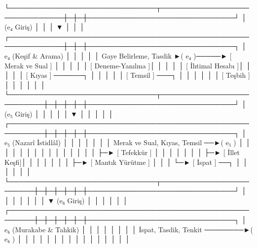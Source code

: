 \documentclass[11pt,a4paper]{article}
\begin{document}
└──────────────────────────────┬──────────────────────────────┼─┼─┼──────────────────────────────┘
                               │ (e₄ Giriş)                   │ │ │
                               ▼                              │ │ │
┌─────────────────────────────────────────────────────────────┼─┼─┼──────────────────────────────┐
│  e₄ (Keşif & Arama)                                         │ │ │                              │
│  { Gaye Belirleme, Tasdik }►( e₄ )─────► [ Merak ve Sual ]  │ │ │                              │
│                                           [ Deneme-Yanılma ]│ │ │                              │
│                                           [ İhtimal Hesabı ]│ │ │                              │
│                                           [ Kıyas ] ──────┐ │ │ │                              │
│                                           [ Temsil ] ───┐ │ │ │ │                              │
│                                           [ Teşbih ]    │ │ │ │ │                              │
└──────────────────────────────┬──────────────────────────┼─┼─┼─┼─┼──────────────────────────────┘
                               │ (e₅ Giriş)               │ │ │ │ │
                               ▼                          │ │ │ │ │
┌─────────────────────────────────────────────────────────┼─┼─┼─┼─┼──────────────────────────────┐
│  e₅ (Nazarî İstidlâl)                                   │ │ │ │ │                              │
│  { Merak ve Sual, Kıyas, Temsil } ──►( e₅ )             │ │ │ │ │                              │
│                                       │                 │ │ │ │ │                              │
│                                       ├─► [ Tefekkür ]  │ │ │ │ │                              │
│                                       ├─► [ İllet Keşfi]│ │ │ │ │                              │
│                                       ├─► [ Mantık Yürütme ]    │                              │
│                                       └─► [ İspat ] ──┐ │ │ │ │ │                              │
└──────────────────────────────┬────────────────────────┼─┼─┼─┼─┼─┼──────────────────────────────┘
                               │                        │ │ │ │ │ │
                               ▼ (e₆ Giriş)             │ │ │ │ │ │
┌───────────────────────────────────────────────────────┼─┼─┼─┼─┼─┼──────────────────────────────┐
│  e₆ (Murakabe & Tahkik)                               │ │ │ │ │ │                              │
│  { İspat, Tasdik, Tenkit } ────────►( e₆ )            │ │ │ │ │ │                              │
│                                       │               │ │ │ │ │ │                              │
\end{document}
